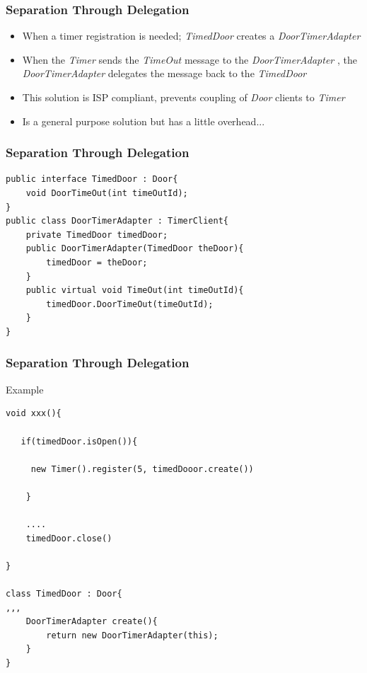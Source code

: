 \documentclass{beamer}
\begin{document}
\begin{frame}
  \frametitle{Separation Through Delegation}
  \begin{itemize}
	\item<+-> When a timer registration is needed; \textit{TimedDoor} creates a \textit{DoorTimerAdapter}
	\item<+-> When the \textit{Timer} sends the \textit{TimeOut} message to the \textit{DoorTimerAdapter} , the \textit{DoorTimerAdapter} delegates the message back to the \textit{TimedDoor}
	\item<+-> This solution is ISP compliant, prevents coupling of \textit{Door} clients to \textit{Timer}
	\item<+-> Is a general purpose solution but has a little overhead...
   \end{itemize}
\end{frame}

\begin{frame}[containsverbatim]
	\frametitle{Separation Through Delegation}
	\begin{lstlisting}
public interface TimedDoor : Door{
	void DoorTimeOut(int timeOutId);
}
public class DoorTimerAdapter : TimerClient{
	private TimedDoor timedDoor;
	public DoorTimerAdapter(TimedDoor theDoor){
		timedDoor = theDoor;
	}
	public virtual void TimeOut(int timeOutId){
		timedDoor.DoorTimeOut(timeOutId);
	}
}
	\end{lstlisting}
\end{frame}

\begin{frame}[containsverbatim]
	\frametitle{Separation Through Delegation}
	Example 
	\begin{lstlisting}
void xxx(){
   
   if(timedDoor.isOpen()){
    
     new Timer().register(5, timedDooor.create())

    }

    ....
    timedDoor.close()

}

class TimedDoor : Door{
,,,
	DoorTimerAdapter create(){
		return new DoorTimerAdapter(this);
	}
}
	\end{lstlisting}
\end{frame}
\end{document}

